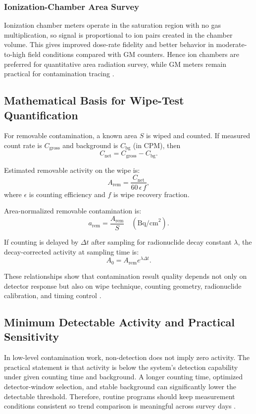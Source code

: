 \subsubsection{Ionization-Chamber Area Survey}
Ionization chamber meters operate in the saturation region with no gas multiplication, so signal is proportional to ion pairs created in the chamber volume. This gives improved dose-rate fidelity and better behavior in moderate-to-high field conditions compared with GM counters. Hence ion chambers are preferred for quantitative area radiation survey, while GM meters remain practical for contamination tracing \cite{podgorsak2005radiation,bushberg2011essential}.

\subsection{Mathematical Basis for Wipe-Test Quantification}
For removable contamination, a known area $S$ is wiped and counted. If measured count rate is $C_{\text{gross}}$ and background is $C_{\text{bg}}$ (in CPM), then
\begin{equation}
    C_{\text{net}} = C_{\text{gross}} - C_{\text{bg}}.
\end{equation}

Estimated removable activity on the wipe is:
\begin{equation}
    A_{\text{rem}} = \frac{C_{\text{net}}}{60\,\epsilon\,f},
\end{equation}
where $\epsilon$ is counting efficiency and $f$ is wipe recovery fraction.

Area-normalized removable contamination is:
\begin{equation}
    a_{\text{rem}} = \frac{A_{\text{rem}}}{S} \quad (\text{Bq/cm}^2).
\end{equation}

If counting is delayed by $\Delta t$ after sampling for radionuclide decay constant $\lambda$, the decay-corrected activity at sampling time is:
\begin{equation}
    A_0 = A_{\text{rem}}e^{\lambda \Delta t}.
\end{equation}

These relationships show that contamination result quality depends not only on detector response but also on wipe technique, counting geometry, radionuclide calibration, and timing control \cite{cherry2012physics,knoll2010radiation,iaea_ssg46}.

\subsection{Minimum Detectable Activity and Practical Sensitivity}
In low-level contamination work, non-detection does not imply zero activity. The practical statement is that activity is below the system's detection capability under given counting time and background. A longer counting time, optimized detector-window selection, and stable background can significantly lower the detectable threshold. Therefore, routine programs should keep measurement conditions consistent so trend comparison is meaningful across survey days \cite{knoll2010radiation,iaea_ssg46}.

